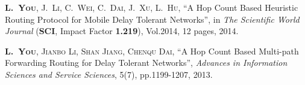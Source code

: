 \begin{publications}{99}
\item\textsc{\textbf{L.~You}, J.~Li, C.~Wei, C.~Dai, J.~Xu, L.~Hu}, ``A Hop Count Based Heuristic Routing Protocol for Mobile Delay Tolerant Networks'', in \textit{The Scientific World Journal} (\textbf{SCI}, Impact Factor \textbf{1.219}), Vol.2014, 12 pages, 2014.

\item\textsc{\textbf{L.~You}, Jianbo Li, Shan Jiang, Chenqu Dai}, ``A Hop Count Based Multi-path Forwarding Routing for Delay Tolerant Networks'', {\it Advances in Information Sciences and Service Sciences}, 5(7), pp.1199-1207, 2013.
    
\end{publications}


